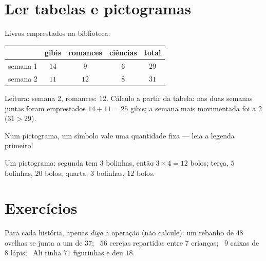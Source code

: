 \section{Ler tabelas e pictogramas}

\begin{example}\label{ex:g3:problems:table}
Livros emprestados na biblioteca:
\begin{center}
\renewcommand{\arraystretch}{1.3}
\begin{tabular}{l|cccc}
 & gibis & romances & ciências & total \\
\hline
semana 1 & $14$ & $9$ & $6$ & $29$ \\
semana 2 & $11$ & $12$ & $8$ & $31$ \\
\end{tabular}
\end{center}
Leitura: semana 2, romances: $12$. Cálculo a partir da tabela: nas
duas semanas juntas foram emprestados $14 + 11 = 25$ gibis; a semana
mais movimentada foi a 2 ($31 > 29$).
\end{example}

\begin{example}[Um pictograma]\label{ex:g3:problems:pictogram}
Num pictograma, um símbolo vale uma quantidade fixa --- leia a
legenda primeiro!

\begin{omfigure}

{\small Um pictograma: segunda tem $3$ bolinhas, então
$3 \times 4 = 12$ bolos; terça, $5$ bolinhas, $20$ bolos; quarta,
$3$ bolinhas, $12$ bolos.}
\end{omfigure}
\end{example}

\section{Exercícios}

\begin{exercise}[$\star$]\label{exo:g3:problems:1}
Para cada história, apenas \emph{diga} a operação (não calcule):
um rebanho de $48$ ovelhas se junta a um de $37$; \ $56$ cerejas
repartidas entre $7$ crianças; \ $9$ caixas de $8$ lápis; \ Ali tinha
$71$ figurinhas e deu $18$.
\end{exercise}

